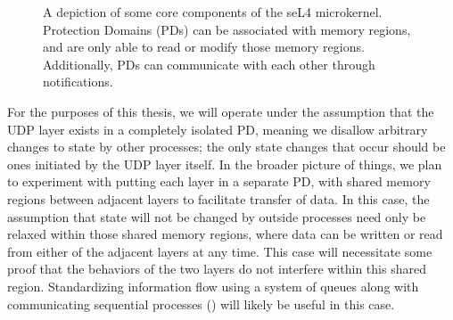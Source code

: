 \documentclass[twoside]{memoir}
\begin{document}
\begin{figure}[h]
    \centering
    \caption{A depiction of some core components of the seL4 microkernel.
    Protection Domains (PDs) can be associated with memory regions,
    and are only able to read or modify those memory regions.
    Additionally, PDs can communicate with each other through notifications.}
    \label{fig:sel4-mem-pd}
\end{figure}

For the purposes of this thesis, we will operate under the assumption that
the UDP layer exists in a completely isolated PD, meaning
we disallow arbitrary changes to state by other processes;
the only state changes that occur should be ones initiated by the UDP
layer itself.
In the broader picture of things, we plan to experiment with putting
each layer in a separate PD,
with shared memory regions between adjacent layers to facilitate transfer of data.
In this case, the assumption that state will not be changed by outside processes
need only be relaxed within those shared memory regions, where
data can be written or read from either of the adjacent layers at any time.
This case will necessitate some proof that the behaviors of the two layers
do not interfere within this shared region.
Standardizing information flow using a system of queues along with 
communicating sequential processes (\cite{csp})
will likely be useful in this case.
\end{document}
